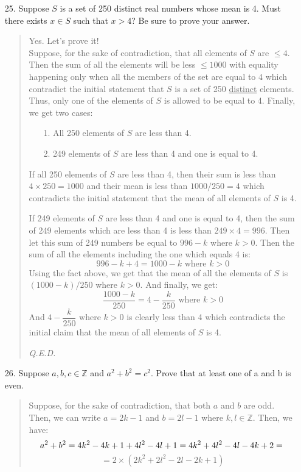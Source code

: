 \documentclass[12pt, a4paper]{article}                      %
\begin{document}
\begin{enumerate}
\item[25.]
Suppose $S$ is a set of 250 distinct real numbers whose mean is 4. Must there exists
$x \in S$ such that $x > 4$? Be sure to prove your answer.
\begin{quote}
Yes. Let's prove it!\\
Suppose, for the sake of contradiction, that all elements of $S$ are $\leq 4$.
Then the sum of all the elements will be less $\leq 1000$ with equality happening only
when all the members of the set are equal to $4$ which contradict the initial statement that
$S$ is a set of 250 \underline{distinct} elements. Thus, only one of the elements of $S$ is allowed
to be equal to 4. Finally, we get two cases:
\begin{center}
\begin{itemize}
\item[1.]
All 250 elements of $S$ are less than 4.
\item[2.]
249 elements of $S$ are less than 4 and one is equal to 4.
\end{itemize}
\end{center}
If all 250 elements of $S$ are less than 4, then their sum is less than $4 \times 250 = 1000$ and their mean
is less than $1000 / 250 = 4$ which contradicts the initial statement that the mean of all elements of $S$ is 4.

If 249 elements of $S$ are less than 4 and one is equal to 4, then the sum of 249 elements which are less than 4 is less than
$249 \times 4 = 996$. Then let this sum of 249 numbers be equal to $996 - k$ where $k > 0$. Then the sum of all the elements including
the one which equals 4 is:
$$
996 - k + 4 = 1000 - k \mbox{ where } k > 0
$$
Using the fact above, we get that the mean of all the elements of $S$ is $(1000 - k)/250$ where $k > 0$.
And finally, we get:
$$
\dfrac{1000 - k}{250} = 4 - \dfrac{k}{250} \mbox{ where } k > 0
$$
And $4 - \dfrac{k}{250} \mbox{ where } k > 0$ is clearly less than 4 which contradicts
the initial claim that the mean of all elements of $S$ is 4.
\begin{flushright}
\textit{Q.E.D.}
\end{flushright}
\end{quote}

\item[26.]
Suppose $a, b, c \in \mathbb{Z}$ and $a^2 + b^2 = c^2$.
Prove that at least one of a and b is even.
\begin{quote}
Suppose, for the sake of contradiction, that both $a$ and $b$ are odd.
Then, we can write $a = 2k - 1$ and $b = 2l - 1$ where $k,l \in \mathbb{Z}$.
Then, we have:
$$
a^2 + b^2 = 4k^2 - 4k + 1 + 4l^2 - 4l + 1 = 4k^2 + 4l^2 - 4l - 4k + 2 = \\
$$
$$
= 2 \times (2k^2 + 2l^2 - 2l - 2k + 1)
$$


\end{quote}
\end{enumerate}
\end{document}
